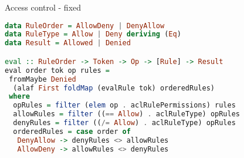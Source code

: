 \documentclass[ignorenonframetext,aspectratio=169,dvipsnames]{beamer}
\begin{document}
\begin{frame}[fragile]{Access control - fixed}
\begin{lstlisting}[language=Haskell]
data RuleOrder = AllowDeny | DenyAllow
data RuleType = Allow | Deny deriving (Eq)
data Result = Allowed | Denied

eval :: RuleOrder -> Token -> Op -> [Rule] -> Result
eval order tok op rules =
 fromMaybe Denied
  (alaf First foldMap (evalRule tok) orderedRules)
 where
  opRules = filter (elem op . aclRulePermissions) rules
  allowRules = filter ((== Allow) . aclRuleType) opRules
  denyRules = filter ((/= Allow) . aclRuleType) opRules
  orderedRules = case order of
   DenyAllow -> denyRules <> allowRules
   AllowDeny -> allowRules <> denyRules
\end{lstlisting}
\end{frame}
\end{document}
